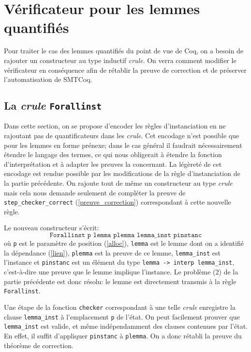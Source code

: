 \documentclass[11pt]{article}
\begin{document}
\section{Vérificateur pour les lemmes quantifiés} \label{instanciations}

Pour traiter le cas des lemmes quantifiés du point de vue de Coq, on a besoin de rajouter un constructeur au type inductif \textit{crule}. On verra comment modifier le vérificateur en conséquence afin de rétablir la preuve de correction et de préserver l'automatisation de SMTCoq.


\subsection{La \textit{crule} \texttt{Forallinst}}

Dans cette section, on se propose d'encoder les règles d'instanciation en ne rajoutant pas de quantificateurs dans les \textit{crule}. Cet encodage n'est possible que pour les lemmes en forme prénexe; dans le cas général il faudrait nécessairement étendre le langage des termes, ce qui nous obligerait à étendre la fonction d'interprétation et à adapter les preuves la concernant. La légèreté de cet encodage est rendue possible par les modifications de la règle d'instanciation de la partie précédente. On rajoute tout de même un constructeur au type \textit{crule} mais cela nous demande seulement de compléter la preuve de  \texttt{step\_checker\_correct} (\ref{preuve_correction}) correspondant à cette nouvelle règle.   \medbreak

Le nouveau constructeur s'écrit:
\[\texttt{Forallinst p lemma plemma lemma\_inst pinstanc}\]
où \texttt{p} est le para\-mètre de position (\ref{alloc}), \texttt{lemma} est le lemme dont on a identifié la dépendance (\ref{lien}), \texttt{plemma} est la preuve de ce lemme, \texttt{lemma\_inst} est l'instance et \texttt{pinstanc} est un élément du type \texttt{lemma -> interp lemma\_inst}, c'est-à-dire une preuve que le lemme implique l'instance. Le problème (2) de la partie précédente est donc résolu: le lemme est directement transmis à la règle \texttt{Forallinst}. \medbreak

Une étape de la fonction \texttt{checker} correspondant à une telle \textit{crule} enregistre la clause \texttt{lemma\_inst} à l'emplacement \texttt{p} de l'état. On peut facilement prouver que \texttt{lemma\_inst} est valide, et même indépen\-damment des clauses contenues par l'état. En effet, il suffit d'appliquer \texttt{pinstanc} à \texttt{plemma}. On a donc rétabli la preuve du théorème de correction.\medbreak
\end{document}
